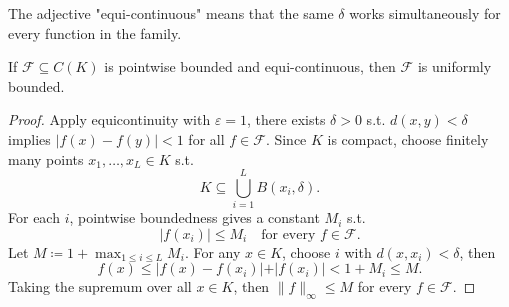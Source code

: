 \begin{remark}
    The adjective "equi-continuous" means that the same \(\delta\) works simultaneously for every function in the family. 
\end{remark}

\begin{lemma} \label{lm: Pointwise boundedness becomes uniform boundedness}
    If \(\mathcal{F} \subseteq C(K)\) is pointwise bounded and equi-continuous, then \(\mathcal{F} \) is uniformly bounded.   
\end{lemma}
\begin{proof}
    Apply equicontinuity with \(\varepsilon = 1\), there exists \(\delta > 0\) s.t. \(d(x, y) < \delta \) implies \(\vert f(x) - f(y) \vert < 1 \) for all \(f \in \mathcal{F}\). Since \(K\) is compact, choose finitely many points \(x_1, \dots , x_L \in K\) s.t. 
    \[
        K \subseteq \bigcup_{i=1}^{L} B(x_i, \delta). 
    \]   
    For each \(i\), pointwise boundedness gives a constant \(M_i\) s.t. 
    \[
        \vert f(x_i) \vert \le M_i \quad \text{for every } f \in \mathcal{F}.  
    \]  
    Let \(M \coloneqq 1 + \max _{1 \le i \le L} M_i\). For any \(x \in K\), choose \(i\) with \(d(x, x_i) < \delta\), then 
    \[
        f(x) \le \vert f(x) - f(x_i) \vert + \vert f(x_i) \vert < 1 + M_i \le M.  
    \]    
    Taking the supremum over all \(x \in K\), then \(\lVert f \rVert_{\infty} \le M \) for every \(f \in \mathcal{F}\).   
\end{proof}